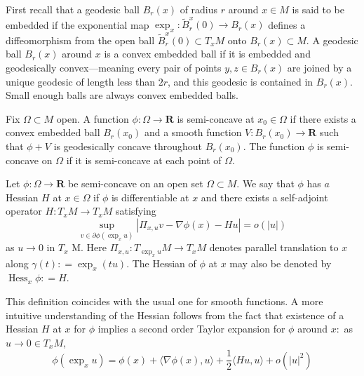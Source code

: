 First recall that a geodesic ball \( B _ { r } ( x ) \) of radius \( r \) around \( x \in M \) is said to be embedded if the exponential map \( \exp _ { x } : \tilde { B } _ { r } ^ { x } ( 0 ) \rightarrow B _ { r } ( x ) \) defines a diffeomorphism from the open ball \( \tilde { B } _ { r } ^ { x } ( 0 ) \subset T _ { x } M \) onto \( B _ { r } ( x ) \subset M \).
A geodesic ball \( B _ { r } ( x ) \) around \( x \) is a convex embedded ball if it is embedded and geodesically convex---meaning every pair of points \( y , z \in B _ { r } ( x ) \) are joined by a unique geodesic of length less than \( 2 r \), and this geodesic is contained in \( B _ { r } ( x )\).
Small enough balls are always convex embedded balls.

\begin{defn}
	\label{defn:semi-concavity}
	Fix \( \Omega \subset M \) open. A function \( \phi : \Omega \rightarrow \mathbf { R } \) is semi-concave at \( x _ { 0 } \in \Omega \) if there exists a convex embedded ball \( B _ { r } \left( x _ { 0 } \right) \) and a smooth function \( V : B _ { r } \left( x _ { 0 } \right) \rightarrow \mathbf { R } \) such that \( \phi + V \) is geodesically concave throughout \( B _ { r } \left( x _ { 0 } \right) . \) The function \( \phi \) is semi-concave on \( \Omega \) if it is semi-concave at each point of \( \Omega \).
\end{defn}

\begin{defn}[Hessian]
	Let \( \phi : \Omega \rightarrow \mathbf { R } \) be semi-concave on an open set \( \Omega \subset M . \) We say that \( \phi \) has \( a \) Hessian \( H \) at \( x \in \Omega \) if \( \phi \) is differentiable at \( x \)
	and there exists a self-adjoint operator \( H : T _ { x } M \rightarrow T _ { x } M \) satisfying
	\begin{equation}
		\label{defn:hessian}
		\sup _ { v \in \partial \phi \left( \exp _ { x } u \right) } \left| \Pi _ { x , u } v - \nabla \phi ( x ) - H u \right| = o ( | u | )
	\end{equation}
	as \( u \rightarrow 0 \) in \( T _ { x } \) M. Here \( \Pi _ { x , u } : T _ { \exp _ { x } u } M \rightarrow T _ { x } M \) denotes parallel translation to \( x \) along \( \gamma ( t ) : = \exp _ { x } ( t u ) . \) The Hessian of \( \phi \) at \( x \) may also be denoted
	by \( \operatorname { Hess } _ { x } \phi : = H \).
\end{defn}

This definition coincides with the usual one for smooth functions. A more intuitive understanding of the Hessian follows from the fact that existence of a Hessian \( H \) at \( x \) for \( \phi \) implies a second order Taylor expansion for \( \phi \) around \( x : \) as \( u \rightarrow 0 \in T _ { x } M \),
\begin{equation}
	\label{equa:hessian_expan}
	\phi \left( \exp _ { x } u \right) = \phi ( x ) + \langle \nabla \phi ( x ) , u \rangle + \frac { 1 } { 2 } \langle H u , u \rangle + o \left( | u | ^ { 2 } \right)
\end{equation}

